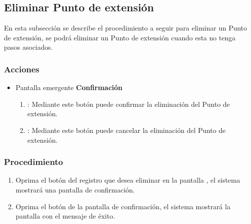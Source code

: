 \subsection{Eliminar Punto de extensión}

En esta subsección se describe el procedimiento a seguir para eliminar un Punto de extensión, se podrá eliminar un Punto de extensión cuando esta no tenga pasos asociados.


\subsubsection{Acciones}
\begin{itemize}
  \item Pantalla emergente \textbf{Confirmación}
  \begin{enumerate}
	\item {}: Mediante este botón puede confirmar la eliminación del Punto de extensión.
	\item {}: Mediante este botón puede cancelar la eliminación del Punto de extensión.
  \end{enumerate}
\end{itemize}


\subsubsection{Procedimiento}
\begin{enumerate}
	\item Oprima el botón \btnEliminar del registro que desea eliminar en la pantalla , el sistema mostrará una pantalla de confirmación.
	
	\item Oprima el botón  de la pantalla de confirmación, el sistema mostrará la pantalla  con el mensaje de éxito.
\end{enumerate}

